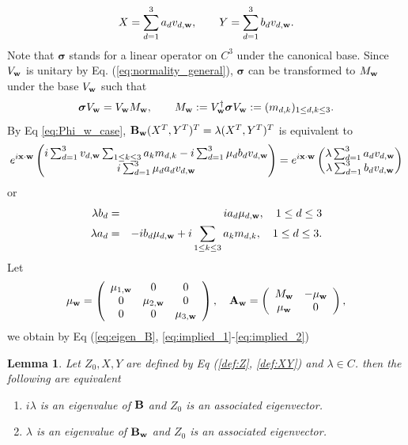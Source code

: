 \documentclass[10pt,reqno]{amsart}
\newcommand{\bB}{{\bf B}}
\newcommand{\bA}{{\bf A}}
\newcommand{\bS}{\boldsymbol{\sigma}}
\renewcommand{\(}{\left(}
\renewcommand{\)}{\right)}
\newcommand{\bw}{{\bf w}}
\newcommand{\BB}{{\bf B}}
\newcommand{\bx}{\mathbf{x}}
\newtheorem{lem}[theo]{Lemma}
\numberwithin{equation}{section}
\begin{document}
\begin{equation}\label{def:XY}
	X=\sum_{d=1}^3 a_d v_{d,\bw},  \qquad Y=\sum_{d=1}^3 b_d v_{d,\bw}.
\end{equation}
Note that $\bS$ stands for a linear operator on $C^3$ under the canonical base.  Since $V_{\bw}$ is unitary by Eq. (\ref{eq:normality_general}), $\bS$ can be transformed to $M_{\bw}$ under the base $V_{\bw}$ such that
\begin{equation}\label{def:M}
\bS V_{\bw} = V_{\bw} M_{\bw},  \qquad  M_{\bw} :=  V_{\bw}^{\dagger} \bS V_{\bw} :=(m_{d,k})_{1\le d,k\le 3}.
\end{equation}
By Eq \ref{eq:Phi_w_case}, 
$\BB_{\bw}(X^T,Y^T)^T=\lambda (X^T,Y^T)^T$ is equivalent to 
\[
e^{i\bx \cdot \bw} \begin{pmatrix}
	i\sum_{d=1}^3  v_{d,\bw} \sum_{1\le k\le 3}  a_k m_{d,k}  - i\sum_{d=1}^3 \mu_d b_d v_{d,\bw}  \\
	i\sum_{d=1}^3 \mu_d a_d v_{d,\bw} 
\end{pmatrix} = e^{i\bx \cdot \bw} 
\begin{pmatrix}
	\lambda \sum_{d=1}^3 a_d v_{d,\bw}  \\
	\lambda	\sum_{d=1}^3 b_d v_{d,\bw} 
\end{pmatrix}
\]
or
\begin{eqnarray}
	 \lambda b_d  &=& i a_d \mu_{d,\bw},  \quad 1\le d \le 3  \label{eq:implied_1}\\
	\lambda a_d   &=& -i b_d \mu_{d,\bw} + i \sum_{1\le k\le 3}  a_k m_{d,k}, \quad 1\le d\le 3. \label{eq:implied_2}
\end{eqnarray}
\iffalse
Let
\[
\mu_{\bw} =\left(
\begin{array}{ccc}
	\mu_{1,\bw} & 0 & 0\\
	0 & \mu_{2,\bw} & 0 \\
	0  & 0 & \mu_{3,\bw} \\
\end{array}
\right),  \quad \bA_{\bw} =   \left(
\begin{array}{cc}
	M_{\bw} & -\mu_{\bw} \\
	\mu_{\bw}  & 0  \\
\end{array}
\right),
\]
we obtain by Eq (\ref{eq:eigen_B}, \ref{eq:implied_1}-\ref{eq:implied_2})
\begin{lem}Let $Z_0, X, Y$ are defined by Eq (\ref{def:Z}, \ref{def:XY}) and $\lambda\in C$.  then the following are equivalent 
\begin{enumerate}
\item  $i\lambda$ is an eigenvalue of $\bB$ and  $Z_0$ is an associated  eigenvector.
\item  $\lambda$ is an eigenvalue of $\BB_{\bw}$ and   $Z_0$ is an associated  eigenvector.
\end{enumerate}   
\end{lem}
\end{document}
